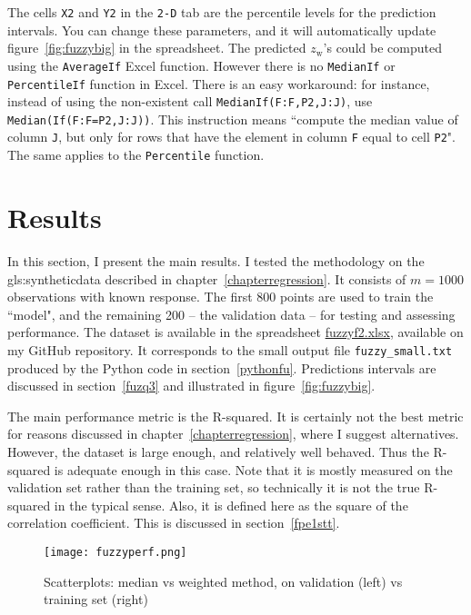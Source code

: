 \documentclass[oneside,10pt]{book}
\begin{document}
\noindent The cells \texttt{X2} and \texttt{Y2} in the \texttt{2-D} tab are the percentile levels for the prediction intervals. You can change these parameters, and it will automatically update figure~\ref{fig:fuzzybig} in the spreadsheet. The predicted $z_{\text{w}}$'s could be computed using the \texttt{AverageIf} Excel function. However there is no
\texttt{MedianIf} or \texttt{PercentileIf} function in Excel.  There is an easy workaround: for instance, instead of using the non-existent
call \texttt{MedianIf(F:F,P2,J:J)}, use \texttt{Median(If(F:F=P2,J:J))}. This instruction means ``compute the median value of column \texttt{J}, but only for rows that have the element in column \texttt{F} equal to cell \texttt{P2}". The same applies to the \texttt{Percentile} function.

\section{Results}

In this section, I present the main results. I tested the methodology on the \gls{gls:syntheticdata} described in chapter~\ref{chapterregression}. It consists of $m=1000$ observations with known response. The first 800 points are used to train the ``model", and the remaining 200 -- the validation data -- for testing and assessing performance. The dataset is available in the
spreadsheet \href{https://github.com/VincentGranville/Machine-Learning/blob/main/Spreadsheets/README.md}{fuzzyf2.xlsx}, available on my GitHub repository. It corresponds to the small output file \texttt{fuzzy\_small.txt} produced by the Python code in section~\ref{pythonfu}. Predictions intervals are discussed in section~\ref{fuzq3} and illustrated in figure~\ref{fig:fuzzybig}.

The main performance metric is the R-squared. It is certainly not the best metric for reasons discussed in chapter~\ref{chapterregression}, where I suggest alternatives. However, the dataset is large enough, and relatively well behaved. Thus the R-squared is adequate enough in this case. Note that it is mostly measured on the validation set rather than the training set, so technically it is not the true R-squared in the typical sense. Also, it is defined here as the square of the correlation coefficient. This is discussed in section~\ref{fpe1stt}.


\begin{figure}%
\centering
\texttt{[image: fuzzyperf.png]}
\caption{Scatterplots: median vs weighted method, on validation (left) vs training set (right)}
\label{fig:frfu}
\end{figure}
\end{document}
